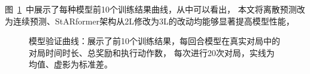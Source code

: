 图~\ref{fig-model-eval}~中展示了每种模型前10个训练结果曲线，从中可以看出，
本文将离散预测改为连续预测、StARformer架构从2L修改为3L的改动均能够显著提高模型性能，

\begin{figure}[htbp]
  \centering
  \setlength{\abovecaptionskip}{0ex}  %
  \caption{模型验证曲线：展示了前10个训练结果，每回合模型在真实对局中的对局时间时长、总奖励和执行动作数，
  每次进行20次对局，实线为均值、虚影为标准差。}\label{fig-model-eval}
\end{figure}